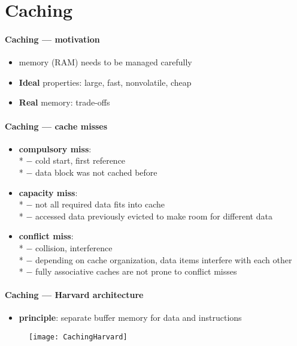 \section{Caching}

\paragraph{Caching --- motivation}
\begin{itemize}
  \item memory (RAM) needs to be managed carefully
  \item \textbf{Ideal} properties: large, fast, nonvolatile, cheap
  \item \textbf{Real} memory: trade-offs
\end{itemize}

\paragraph{Caching --- cache misses}
\begin{itemize}
  \item \textbf{compulsory miss}: \\*
    $ - $ cold start, first reference \\*
    $ - $ data block was not cached before
  \item \textbf{capacity miss}: \\*
    $ - $ not all required data fits into cache \\*
    $ - $ accessed data previously evicted to make room for different data
  \item \textbf{conflict miss}: \\*
    $ - $ collision, interference \\*
    $ - $ depending on cache organization, data items interfere with each other \\*
    $ - $ fully associative caches are not prone to conflict misses
\end{itemize}

\paragraph{Caching --- Harvard architecture}
\begin{itemize}
  \item \textbf{principle}: separate buffer memory for data and instructions
\end{itemize}
\begin{figure}[h]\centering\label{CachingHarvard}\texttt{[image: CachingHarvard]}\end{figure}

